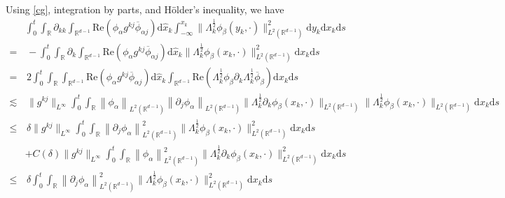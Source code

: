 \documentclass[10pt,twoside,a4paper]{article}
\numberwithin{equation}{section}\allowdisplaybreaks
\def\leq{\leqslant}
\begin{document}
Using \eqref{cg}, integration by parts, and H\"older's inequality, we have
\begin{align} \label{cener_c1_3}
	& \int_0^t \int_{\mathbb{R}}   	\partial_{kk} \int_{\mathbb{R}^{d-1}} \mathrm{Re}\left( \phi_{\alpha }   g^{kj} \overline{\phi}_{\alpha j}\right) \mathrm{d} \hat{x}_k \int_{-\infty}^{x_k} \|\Lambda_k^{\frac 12}\phi_{\beta}(y_k,\cdot)\|^2_{L^2(\mathbb{R}^{d-1})}\mathrm{d} y_k  \mathrm{d} x_k \mathrm{d} s \nonumber\\
	=&\,- \int_0^t\int_{\mathbb{R}}   	\partial_{k} \int_{\mathbb{R}^{d-1}} \mathrm{Re}\left( \phi_{\alpha }   g^{kj} \overline{\phi}_{\alpha j}\right) \mathrm{d} \hat{x}_k  \|\Lambda_k^{\frac 12}\phi_{\beta}(x_k,\cdot)\|^2_{L^2(\mathbb{R}^{d-1})}  \mathrm{d} x_k  \mathrm{d} s \nonumber\\
	=&\,2 \int_0^t\int_{\mathbb{R}}   \int_{\mathbb{R}^{d-1}} \mathrm{Re}\left( \phi_{\alpha }   g^{kj} \overline{\phi}_{\alpha j}\right) \mathrm{d} \hat{x}_k \int_{\mathbb{R}^{d-1}}\mathrm{Re}\left(\Lambda_k^{\frac 12}\phi_{\beta} \partial_k \Lambda_k^{\frac 12}\overline{\phi}_{\beta} \right) \mathrm{d} x_k \mathrm{d} s\nonumber\\
	\lesssim &\,\|g^{kj}\|_{L^\infty}  \int_0^t\int_{\mathbb{R}}  \left\| \phi_{\alpha }\right\|_{L^2(\mathbb{R}^{d-1})}  \left\| \partial_j \phi_{\alpha }\right\|_{L^2(\mathbb{R}^{d-1})}\|\Lambda_k^{\frac 12}\partial_k\phi_{\beta}(x_k,\cdot)\|_{L^2(\mathbb{R}^{d-1})} \|\Lambda_k^{\frac 12}\phi_{\beta}(x_k,\cdot)\|_{L^2(\mathbb{R}^{d-1})}  \mathrm{d} x_k \mathrm{d} s\nonumber\\
	\leq&\,\delta\|g^{kj}\|_{L^\infty} \int_0^t\int_{\mathbb{R}}  \left\| \partial_j \phi_{\alpha }\right\|_{L^2(\mathbb{R}^{d-1})}^2 \|\Lambda_k^{\frac 12}\phi_{\beta}(x_k,\cdot)\|^2_{L^2(\mathbb{R}^{d-1})}   \mathrm{d} x_k \mathrm{d} s\\
	&+ C(\delta)\|g^{kj}\|_{L^\infty} \int_0^t\int_{\mathbb{R}}  \left\| \phi_{\alpha }\right\|_{L^2(\mathbb{R}^{d-1})}^2  \|\Lambda_k^{\frac 12}\partial_k \phi_{\beta}(x_k,\cdot)\|^2_{L^2(\mathbb{R}^{d-1})}  \mathrm{d} x_k \mathrm{d} s\nonumber\\
\leq&\, \delta \int_0^t\int_{\mathbb{R}}  \left\|\partial_j  \phi_{\alpha }\right\|_{L^2(\mathbb{R}^{d-1})}^2 \|\Lambda_k^{\frac 12}\phi_{\beta}(x_k,\cdot)\|^2_{L^2(\mathbb{R}^{d-1})}   \mathrm{d} x_k \mathrm{d} s\nonumber\\

\end{align}
\end{document}
